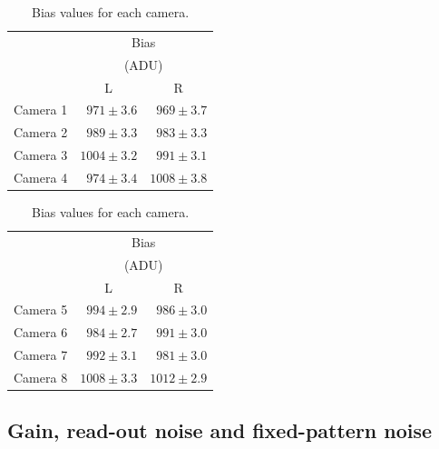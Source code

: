\begin{colsection}
\begin{colsection}
\begin{table}[t]
    \begin{center}
        \begin{tabular}{c|rr} %
             & \multicolumn{2}{c}{Bias} \\
             & \multicolumn{2}{c}{(ADU)} \\
             & \multicolumn{1}{c}{L} & \multicolumn{1}{c}{R} \\
            \midrule
            Camera 1 & $971\pm3.6$ & $969\pm3.7$ \\
            Camera 2 & $989\pm3.3$ & $983\pm3.3$ \\
            Camera 3 & $1004\pm3.2$ & $991\pm3.1$ \\
            Camera 4 & $974\pm3.4$ & $1008\pm3.8$ \\
        \end{tabular}
        \hspace{0.5cm}
        \begin{tabular}{c|rr} %
             & \multicolumn{2}{c}{Bias} \\
             & \multicolumn{2}{c}{(ADU)} \\
             & \multicolumn{1}{c}{L} & \multicolumn{1}{c}{R} \\
            \midrule
            Camera 5 & $994\pm2.9$ & $986\pm3.0$ \\
            Camera 6 & $984\pm2.7$ & $991\pm3.0$ \\
            Camera 7 & $992\pm3.1$ & $981\pm3.0$ \\
            Camera 8 & $1008\pm3.3$ & $1012\pm2.9$ \\
        \end{tabular}
    \end{center}
    \caption[Bias values]{
        Bias values for each camera.
    }\label{tab:bias}
\end{table}

\end{colsection}

\subsection{Gain, read-out noise and fixed-pattern noise}
\label{sec:ptc}
\begin{colsection}


\end{colsection}
\end{colsection}
